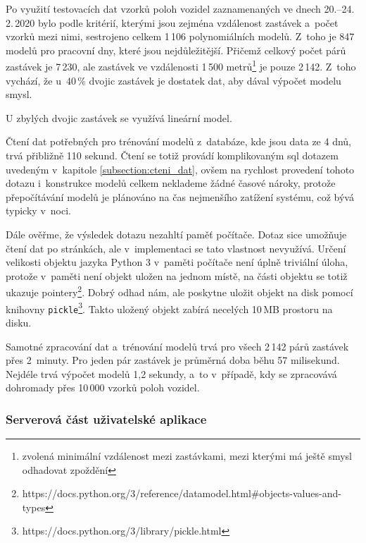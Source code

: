 Po využití testovacích dat vzorků poloh vozidel zaznamenaných ve dnech 20.--24.\,2.\,2020 bylo podle kritérií, kterými jsou zejména vzdálenost zastávek a~počet vzorků mezi nimi, sestrojeno celkem 1\,106 polynomiálních modelů. Z~toho je 847 modelů pro pracovní dny, které jsou nejdůležitější. Přičemž celkový počet párů zastávek je 7\,230, ale zastávek ve vzdálenosti 1\,500 metrů\footnote{zvolená minimální vzdálenost mezi zastávkami, mezi kterými má ještě smysl odhadovat zpoždění} je pouze 2\,142. Z~toho vychází, že u~40\,\% dvojic zastávek je dostatek dat, aby dával výpočet modelu smysl.

\bigbreak

U zbylých dvojic zastávek se využívá lineární model.


\bigbreak

Čtení dat potřebných pro trénování modelů z~databáze, kde jsou data ze 4 dnů, trvá přibližně 110 sekund. Čtení se totiž provádí komplikovaným \gls{sql} dotazem uvedeným v~kapitole \ref{subsection:cteni_dat}, ovšem na rychlost provedení tohoto dotazu i~konstrukce modelů celkem neklademe žádné časové nároky, protože přepočítávání modelů je plánováno na čas nejmenšího zatížení systému, což bývá typicky v~noci.

\bigbreak

Dále ověřme, že výsledek dotazu nezahltí paměť počítače. Dotaz sice umožňuje čtení dat po stránkách, ale v~implementaci se tato vlastnost nevyužívá. Určení velikosti objektu jazyka Python 3 v~paměti počítače není úplně triviální úloha, protože v~paměti není objekt uložen na jednom místě, na části objektu se totiž ukazuje pointery\footnote{https://docs.python.org/3/reference/datamodel.html\#objects-values-and-types}. Dobrý odhad nám, ale poskytne uložit objekt na disk pomocí knihovny \verb-pickle-\footnote{https://docs.python.org/3/library/pickle.html}. Takto uložený objekt zabírá necelých 10\,MB prostoru na disku.


\bigbreak

Samotné zpracování dat a~trénování modelů trvá pro všech 2\,142 párů zastávek přes 2~minuty. Pro jeden pár zastávek je průměrná doba běhu 57 milisekund. Nejdéle trvá výpočet modelů 1,2 sekundy, a~to v~případě, kdy se zpracovává dohromady přes 10\,000 vzorků poloh vozidel.


\subsubsection{Serverová část uživatelské aplikace}

